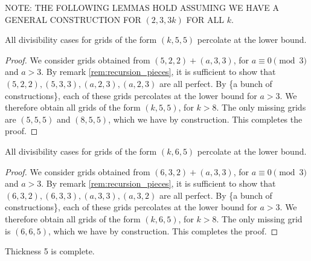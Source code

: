 NOTE: THE FOLLOWING LEMMAS HOLD ASSUMING WE HAVE A GENERAL CONSTRUCTION FOR $(2,3,3k)$ FOR ALL $k$.
\begin{lem}
\label{lem:width_5}
All divisibility cases for grids of the form $(k,5,5)$ percolate at the lower bound.
\end{lem}

\begin{proof}
We consider grids obtained from $(5,2,2) + (a,3,3)$, for $a \equiv 0 \pmod 3$ and $a >3$. By remark \ref{rem:recursion_pieces}, it is sufficient to show that $(5,2,2), (5,3,3), (a,2,3), (a,2,3)$ are all perfect. By \{a bunch of constructions\}, each of these grids percolates at the lower bound for $a>3$. We therefore obtain all grids of the form $(k,5,5)$, for $k>8$. The only missing grids are $(5,5,5)$ and $(8,5,5)$, which we have by construction. This completes the proof. 
\end{proof}

\begin{lem}
\label{lem:width_6}
All divisibility cases for grids of the form $(k,6,5)$ percolate at the lower bound.
\end{lem}

\begin{proof}
We consider grids obtained from $(6,3,2) + (a,3,3)$, for $a \equiv 0 \pmod 3$ and $a >3$. By remark \ref{rem:recursion_pieces}, it is sufficient to show that $(6,3,2), (6,3,3), (a,3,3), (a,3,2)$ are all perfect. By \{a bunch of constructions\}, each of these grids percolates at the lower bound for $a>3$. We therefore obtain all grids of the form $(k,6,5)$, for $k>8$. The only missing grid is $(6,6,5)$, which we have by construction. This completes the proof. 
\end{proof}

\begin{lem}
Thickness 5 is complete.
\end{lem}

